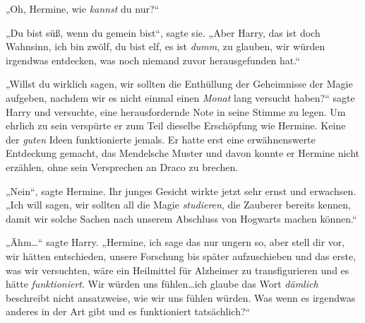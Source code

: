 „Oh, Hermine, wie \emph{kannst} du nur?“

„Du bist süß, wenn du gemein bist“, sagte sie. „Aber Harry, das ist doch Wahnsinn, ich bin zwölf, du bist elf, es ist \emph{dumm}, zu glauben, wir würden irgendwas entdecken, was noch niemand zuvor herausgefunden hat.“

„Willst du wirklich sagen, wir sollten die Enthüllung der Geheimnisse der Magie aufgeben, nachdem wir es nicht einmal einen \emph{Monat} lang versucht haben?“ sagte Harry und versuchte, eine herausfordernde Note in seine Stimme zu legen. Um ehrlich zu sein verspürte er zum Teil dieselbe Erschöpfung wie Hermine. Keine der \emph{guten} Ideen funktionierte jemals. Er hatte erst eine erwähnenswerte Entdeckung gemacht, das Mendelsche Muster und davon konnte er Hermine nicht erzählen, ohne sein Versprechen an Draco zu brechen.

„Nein“, sagte Hermine. Ihr junges Gesicht wirkte jetzt sehr ernst und erwachsen. „Ich will sagen, wir sollten all die Magie \emph{studieren}, die Zauberer bereits kennen, damit wir solche Sachen nach unserem Abschluss von Hogwarts machen können.“

„Ähm…“ sagte Harry. „Hermine, ich sage das nur ungern so, aber stell dir vor, wir hätten entschieden, unsere Forschung bis später aufzuschieben und das erste, was wir versuchten, wäre ein Heilmittel für Alzheimer zu transfigurieren und es hätte \emph{funktioniert}. Wir würden uns fühlen…ich glaube das Wort \emph{dämlich} beschreibt nicht ansatzweise, wie wir uns fühlen würden. Was wenn es irgendwas anderes in der Art gibt und es funktioniert tatsächlich?“

